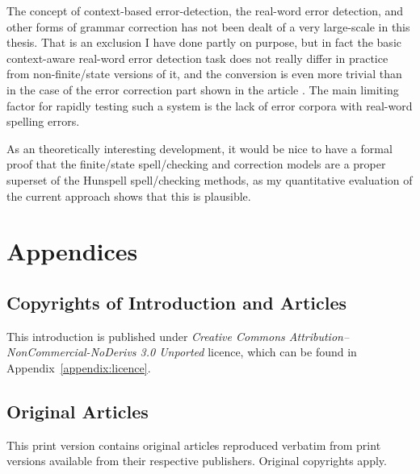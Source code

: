 \documentclass[officiallayout,final]{unihelcompling}
\newif\ifprintversion
\begin{document}
The concept of context-based error-detection, the real-word error detection,
and other forms of grammar correction has not been dealt of a very large-scale
in this thesis. That is an exclusion I have done partly on purpose, but in fact
the basic context-aware real-word error detection task does not really differ
in practice from non-finite\-/state versions of it, and the conversion is even
more trivial than in the case of the error correction part shown in the article
. The main limiting factor for rapidly testing
such a system is the lack of error corpora with real-word spelling errors.

As an theoretically interesting development, it would be nice to have a formal
proof that the finite\-/state spell\-/checking and correction models are a proper
superset of the Hunspell spell\-/checking methods, as my quantitative
evaluation of the current approach shows that this is plausible.






\appendix
\chapter{Appendices}
\section{Copyrights of Introduction and Articles}
\label{appendix:copyrights}

This introduction is published under \emph{Creative Commons
Attribution–NonCommercial-NoDerivs 3.0 Unported} licence, which can be found in
Appendix~\ref{appendix:licence}. 
\ifprintversion
The articles included
in this print version, reproduced without changes from their originals are
copyrighted property of their respective publishers.
\fi

\section{Original Articles}
\label{appendix:articles}

\ifprintversion
This print version contains original articles reproduced verbatim from print
versions available from their respective publishers. Original copyrights apply.











\end{document}
